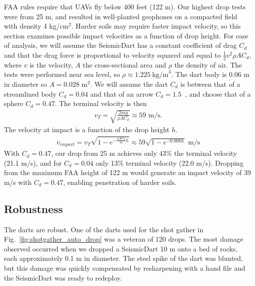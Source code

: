 FAA rules require that UAVs fly below 400 feet (122 m). Our highest drop tests were from 25 m, and resulted in well-planted geophones on a compacted field with density 4 kg/cm$^2$. Harder soils may require faster impact velocity, so this section examines possible impact velocities as a function of drop height.
For ease of analysis, we will assume the SeismicDart has a constant coefficient of drag $C_d$ and that the drag force is proportional to velocity squared and equal to $\frac{1}{2} v^2 \rho A C_d$, where $v$ is the velocity, $A$ the cross-sectional area and $\rho$ the density of air.  
 The tests were performed near sea level, so $\rho \approx 1.225~\text{kg/m}^3$.
  The dart body is 0.06 m in diameter so $A=0.028$ m$^2$.  We will assume the dart $C_d$ is between that of a streamlined body $C_d=0.04$ and that of an arrow $C_d=1.5$~\cite{miyazaki2013aerodynamic}, and choose that of a sphere $C_d=0.47$.
The terminal velocity is then
\begin{align}
v_T = \sqrt{\frac{2 m g}{\rho A  C_d}} \approx 59 \text{ m/s.}
\end{align}
The velocity at impact is a function of the drop height $h$.
\begin{align}
v_{impact} = v_T  \sqrt{ 1 - e^{ -\frac{\rho A  C_d}{m} h }} \approx 59\sqrt{ 1 - e^{ -0.008 h }} \text{ m/s}
\end{align}
With  $C_d=0.47$, our drop from 25 m achieves only 43\% the terminal velocity (21.1 m/s), and for $C_d=0.04$ only 13\% terminal velocity  (22.0 m/s).
Dropping from the maximum FAA height of 122 m would generate an impact velocity of 39 m/s with $C_d=0.47$,  enabling penetration of harder soils.

\subsection{Robustness}
  The darts are robust. One of the darts used for the shot gather in Fig.~\ref{fig:shotgather_auto_drop} was a veteran of 120 drops.
The most damage observed occurred when we dropped a SeismicDart 10 m onto a bed of  rocks, each approximately  0.1 m in diameter. The steel spike of the dart was blunted, but this damage was quickly compensated by resharpening with a hand file and the SeismicDart was ready to redeploy.







